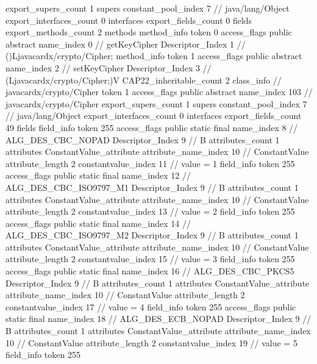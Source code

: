 {{{			export_supers_count	1
			supers {
				constant_pool_index	7		// java/lang/Object
			}
			export_interfaces_count	0
			interfaces {
			}
			export_fields_count	0
			fields {
			}
			export_methods_count	2
			methods {
				method_info {
					token	0
					access_flags	public abstract
					name_index	0		// getKeyCipher
					Descriptor_Index	1		// ()Ljavacardx/crypto/Cipher;
				}
				method_info {
					token	1
					access_flags	public abstract
					name_index	2		// setKeyCipher
					Descriptor_Index	3		// (Ljavacardx/crypto/Cipher;)V
				}
			}
			CAP22_inheritable_count	2
		}
		class_info {		// javacardx/crypto/Cipher
			token	1
			access_flags	public abstract
			name_index	103		// javacardx/crypto/Cipher
			export_supers_count	1
			supers {
				constant_pool_index	7		// java/lang/Object
			}
			export_interfaces_count	0
			interfaces {
			}
			export_fields_count	49
			fields {
			field_info {
				token	255
				access_flags	public static final
				name_index	8		// ALG_DES_CBC_NOPAD
				Descriptor_Index	9		// B
				attributes_count	1
				attributes {
				ConstantValue_attribute {
					attribute_name_index	10		// ConstantValue
					attribute_length	2
					constantvalue_index	11		// value = 1
				}
				}
			}
			field_info {
				token	255
				access_flags	public static final
				name_index	12		// ALG_DES_CBC_ISO9797_M1
				Descriptor_Index	9		// B
				attributes_count	1
				attributes {
				ConstantValue_attribute {
					attribute_name_index	10		// ConstantValue
					attribute_length	2
					constantvalue_index	13		// value = 2
				}
				}
			}
			field_info {
				token	255
				access_flags	public static final
				name_index	14		// ALG_DES_CBC_ISO9797_M2
				Descriptor_Index	9		// B
				attributes_count	1
				attributes {
				ConstantValue_attribute {
					attribute_name_index	10		// ConstantValue
					attribute_length	2
					constantvalue_index	15		// value = 3
				}
				}
			}
			field_info {
				token	255
				access_flags	public static final
				name_index	16		// ALG_DES_CBC_PKCS5
				Descriptor_Index	9		// B
				attributes_count	1
				attributes {
				ConstantValue_attribute {
					attribute_name_index	10		// ConstantValue
					attribute_length	2
					constantvalue_index	17		// value = 4
				}
				}
			}
			field_info {
				token	255
				access_flags	public static final
				name_index	18		// ALG_DES_ECB_NOPAD
				Descriptor_Index	9		// B
				attributes_count	1
				attributes {
				ConstantValue_attribute {
					attribute_name_index	10		// ConstantValue
					attribute_length	2
					constantvalue_index	19		// value = 5
				}
				}
			}
			field_info {
				token	255
}}}}}
